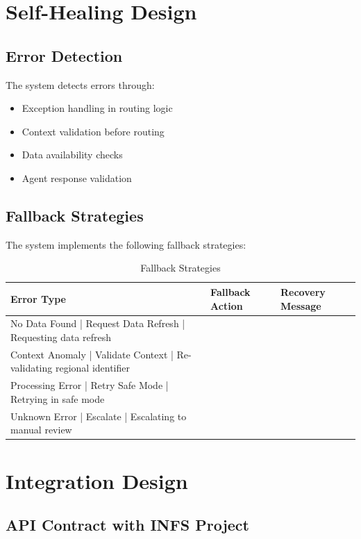 \section{Self-Healing Design}

\subsection{Error Detection}

The system detects errors through:

\begin{itemize}
    \item Exception handling in routing logic
    \item Context validation before routing
    \item Data availability checks
    \item Agent response validation
\end{itemize}

\subsection{Fallback Strategies}

The system implements the following fallback strategies:

\begin{table}[H]
\centering
\begin{tabular}{|l|l|l|}
\hline
\textbf{Error Type} & \textbf{Fallback Action} & \textbf{Recovery Message} \\
\hline
No Data Found | Request Data Refresh | Requesting data refresh \\
Context Anomaly | Validate Context | Re-validating regional identifier \\
Processing Error | Retry Safe Mode | Retrying in safe mode \\
Unknown Error | Escalate | Escalating to manual review \\
\hline
\end{tabular}
\caption{Fallback Strategies}
\end{table}

\section{Integration Design}

\subsection{API Contract with INFS Project}

